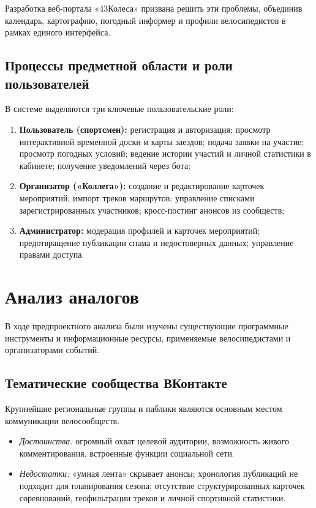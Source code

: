 \documentclass[oneside,a4paper,14pt]{extarticle}
\begin{document}
Разработка веб-портала «43Колеса» призвана решить эти проблемы, объединив календарь, картографию, погодный информер и профили велосипедистов в рамках единого интерфейса.

\subsection{Процессы предметной области и роли пользователей}

В системе выделяются три ключевые пользовательские роли:
\begin{enumerate}
	\item \textbf{Пользователь (спортсмен):} регистрация и авторизация; просмотр интерактивной временной доски и карты заездов; подача заявки на участие; просмотр погодных условий; ведение истории участий и личной статистики в кабинете; получение уведомлений через бота;
	\item \textbf{Организатор («Коллега»):} создание и редактирование карточек мероприятий; импорт треков маршрутов; управление списками зарегистрированных участников; кросс-постинг анонсов из сообществ;
	\item \textbf{Администратор:} модерация профилей и карточек мероприятий; предотвращение публикации спама и недостоверных данных; управление правами доступа.
\end{enumerate}

\section{Анализ аналогов}

В ходе предпроектного анализа были изучены существующие программные инструменты и информационные ресурсы, применяемые велосипедистами и организаторами событий.

\subsection{Тематические сообщества ВКонтакте}
Крупнейшие региональные группы и паблики являются основным местом коммуникации велосообществ.
\begin{itemize}
	\item \textit{Достоинства:} огромный охват целевой аудитории, возможность живого комментирования, встроенные функции социальной сети.
	\item \textit{Недостатки:} «умная лента» скрывает анонсы; хронология публикаций не подходит для планирования сезона; отсутствие структурированных карточек соревнований, геофильтрации треков и личной спортивной статистики.
\end{itemize}
\end{document}
